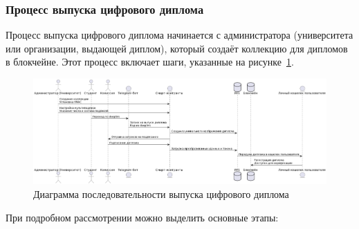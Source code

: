 \subsubsection{Процесс выпуска цифрового диплома}

Процесс выпуска цифрового диплома начинается с администратора (университета или организации, выдающей диплом), который создаёт коллекцию для дипломов в блокчейне. Этот процесс включает шаги, указанные на рисунке~\ref{fig:diploma_issue}.

\begin{figure}[H]
	\centering
	\includegraphics[width=.9\textwidth]{images/diploma_issue.png}
	\parskip=6pt
	\caption{Диаграмма последовательности выпуска цифрового диплома}
	\label{fig:diploma_issue}
\end{figure}

При подробном рассмотрении можно выделить основные этапы:

